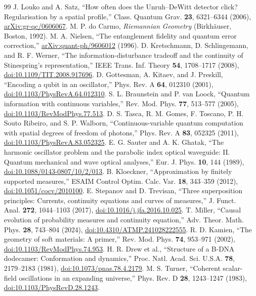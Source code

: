 \documentclass[aip,adv,reprint,onecolumn,amsmath,amssymb]{revtex4-2}
\begin{document}
\begin{thebibliography}{99}
J. Louko and A. Satz, ``How often does the Unruh--DeWitt detector click? Regularisation by a spatial profile,'' Class. Quantum Grav. \textbf{23}, 6321--6344 (2006), \href{https://arxiv.org/abs/gr-qc/0606067}{arXiv:gr-qc/0606067}.
M. P. do Carmo, \emph{Riemannian Geometry} (Birkh\"auser, Boston, 1992).
M. A. Nielsen, ``The entanglement fidelity and quantum error correction,'' \href{https://arxiv.org/abs/quant-ph/9606012}{arXiv:quant-ph/9606012} (1996).
D. Kretschmann, D. Schlingemann, and R. F. Werner, ``The information-disturbance tradeoff and the continuity of Stinespring's representation,'' IEEE Trans. Inf. Theory \textbf{54}, 1708--1717 (2008), \href{https://doi.org/10.1109/TIT.2008.917696}{doi:10.1109/TIT.2008.917696}.
D. Gottesman, A. Kitaev, and J. Preskill, ``Encoding a qubit in an oscillator,'' Phys. Rev. A \textbf{64}, 012310 (2001), \href{https://doi.org/10.1103/PhysRevA.64.012310}{doi:10.1103/PhysRevA.64.012310}.
S. L. Braunstein and P. van Loock, ``Quantum information with continuous variables,'' Rev. Mod. Phys. \textbf{77}, 513--577 (2005), \href{https://doi.org/10.1103/RevModPhys.77.513}{doi:10.1103/RevModPhys.77.513}.
D. S. Tasca, R. M. Gomes, F. Toscano, P. H. Souto Ribeiro, and S. P. Walborn, ``Continuous-variable quantum computation with spatial degrees of freedom of photons,'' Phys. Rev. A \textbf{83}, 052325 (2011), \href{https://doi.org/10.1103/PhysRevA.83.052325}{doi:10.1103/PhysRevA.83.052325}.
E. G. Sauter and A. K. Ghatak, ``The harmonic oscillator problem and the parabolic index optical waveguide: II. Quantum mechanical and wave optical analyses,'' Eur. J. Phys. \textbf{10}, 144 (1989), \href{https://doi.org/10.1088/0143-0807/10/2/013}{doi:10.1088/0143-0807/10/2/013}.
B. Kloeckner, ``Approximation by finitely supported measures,'' ESAIM Control Optim. Calc. Var. \textbf{18}, 343--359 (2012), \href{https://doi.org/10.1051/cocv/2010100}{doi:10.1051/cocv/2010100}.
E. Stepanov and D. Trevisan, ``Three superposition principles: Currents, continuity equations and curves of measures,'' J. Funct. Anal. \textbf{272}, 1044--1103 (2017), \href{https://doi.org/10.1016/j.jfa.2016.10.025}{doi:10.1016/j.jfa.2016.10.025}.
T. Miller, ``Causal evolution of probability measures and continuity equation,'' Adv. Theor. Math. Phys. \textbf{28}, 743--804 (2024), \href{https://doi.org/10.4310/ATMP.241028222555}{doi:10.4310/ATMP.241028222555}.
R. D. Kamien, ``The geometry of soft materials: A primer,'' Rev. Mod. Phys. \textbf{74}, 953--971 (2002), \href{https://doi.org/10.1103/RevModPhys.74.953}{doi:10.1103/RevModPhys.74.953}.
H. R. Drew et al., ``Structure of a B-DNA dodecamer: Conformation and dynamics,'' Proc. Natl. Acad. Sci. U.S.A. \textbf{78}, 2179--2183 (1981), \href{https://doi.org/10.1073/pnas.78.4.2179}{doi:10.1073/pnas.78.4.2179}.
M. S. Turner, ``Coherent scalar-field oscillations in an expanding universe,'' Phys. Rev. D \textbf{28}, 1243--1247 (1983), \href{https://doi.org/10.1103/PhysRevD.28.1243}{doi:10.1103/PhysRevD.28.1243}.
\end{thebibliography}
\end{document}
